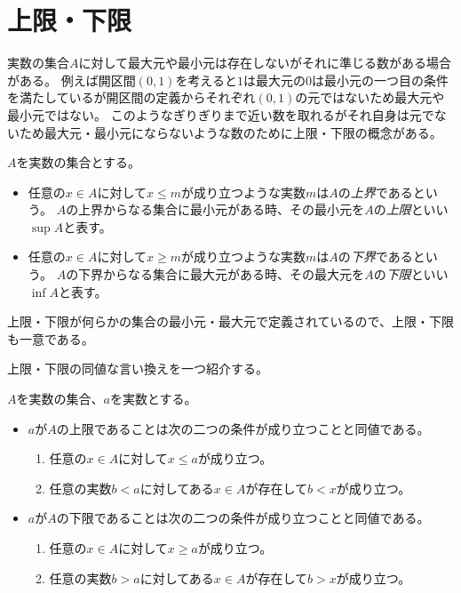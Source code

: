 \section{上限・下限}

実数の集合$A$に対して最大元や最小元は存在しないがそれに準じる数がある場合がある。
例えば開区間$(0, 1)$を考えると$1$は最大元の$0$は最小元の一つ目の条件を満たしているが開区間の定義からそれぞれ$(0, 1)$の元ではないため最大元や最小元ではない。
このようなぎりぎりまで近い数を取れるがそれ自身は元でないため最大元・最小元にならないような数のために上限・下限の概念がある。

\begin{definition}[集合の上限と下限]
$A$を実数の集合とする。
\begin{itemize}
\item
任意の$x \in A$に対して$x \le m$が成り立つような実数$m$は$A$の\emph{上界}であるという。
$A$の上界からなる集合に最小元がある時、その最小元を$A$の\emph{上限}といい$\sup A$と表す。
\item
任意の$x \in A$に対して$x \ge m$が成り立つような実数$m$は$A$の\emph{下界}であるという。
$A$の下界からなる集合に最大元がある時、その最大元を$A$の\emph{下限}といい$\inf A$と表す。
\end{itemize}
\end{definition}

上限・下限が何らかの集合の最小元・最大元で定義されているので、上限・下限も一意である。

上限・下限の同値な言い換えを一つ紹介する。

\begin{proposition}
$A$を実数の集合、$a$を実数とする。
\begin{itemize}
\item
$a$が$A$の上限であることは次の二つの条件が成り立つことと同値である。
\begin{enumerate}
\item
任意の$x \in A$に対して$x \le a$が成り立つ。
\item
任意の実数$b < a$に対してある$x \in A$が存在して$b < x$が成り立つ。
\end{enumerate}
\item
$a$が$A$の下限であることは次の二つの条件が成り立つことと同値である。
\begin{enumerate}
\item
任意の$x \in A$に対して$x \ge a$が成り立つ。
\item
任意の実数$b > a$に対してある$x \in A$が存在して$b > x$が成り立つ。
\end{enumerate}
\end{itemize}
\end{proposition}

